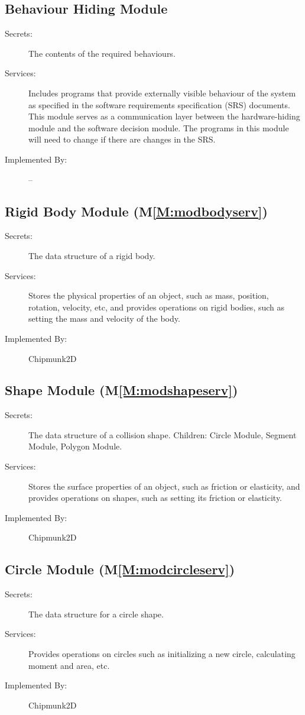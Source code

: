 \documentclass[12pt]{article}
\begin{document}
\subsection{Behaviour Hiding Module}
\label{Sec:BehaHidiModu}
\begin{description}
\item[Secrets:]The contents of the required behaviours.
\item[Services:]Includes programs that provide externally visible behaviour of the system as specified in the software requirements specification (SRS) documents. This module serves as a communication layer between the hardware-hiding module and the software decision module. The programs in this module will need to change if there are changes in the SRS.
\item[Implemented By:]--
\end{description}
\subsection{Rigid Body Module (M\ref{M:modbodyserv})}
\label{Sec:RigiBodyModu()}
\begin{description}
\item[Secrets:]The data structure of a rigid body.
\item[Services:]Stores the physical properties of an object, such as mass, position, rotation, velocity, etc, and provides operations on rigid bodies, such as setting the mass and velocity of the body.
\item[Implemented By:]Chipmunk2D
\end{description}
\subsection{Shape Module (M\ref{M:modshapeserv})}
\label{Sec:ShapModu()}
\begin{description}
\item[Secrets:]The data structure of a collision shape. Children: Circle Module, Segment Module, Polygon Module.
\item[Services:]Stores the surface properties of an object, such as friction or elasticity, and provides operations on shapes, such as setting its friction or elasticity.
\item[Implemented By:]Chipmunk2D
\end{description}
\subsection{Circle Module (M\ref{M:modcircleserv})}
\label{Sec:CircModu()}
\begin{description}
\item[Secrets:]The data structure for a circle shape.
\item[Services:]Provides operations on circles such as initializing a new circle, calculating moment and area, etc.
\item[Implemented By:]Chipmunk2D
\end{description}
\end{document}
